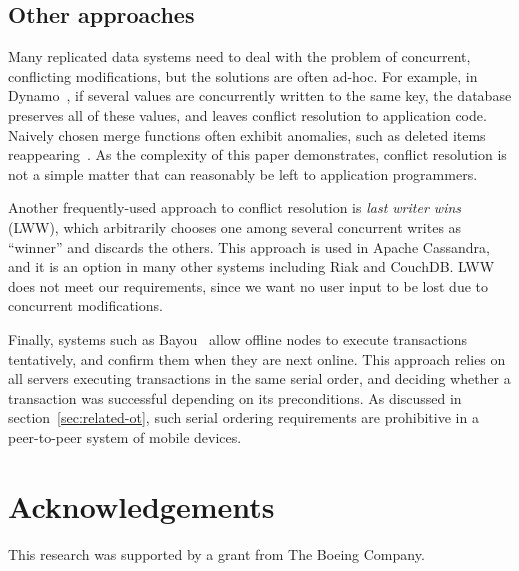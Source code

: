 \documentclass[10pt,journal,compsoc]{IEEEtran}
\begin{document}
\subsection{Other approaches}\label{sec:related-other}

Many replicated data systems need to deal with the problem of concurrent, conflicting modifications, but the solutions are often ad-hoc. For example, in Dynamo~\cite{DeCandia:2007ui}, if several values are concurrently written to the same key, the database preserves all of these values, and leaves conflict resolution to application code. Naively chosen merge functions often exhibit anomalies, such as deleted items reappearing~\cite{DeCandia:2007ui}. As the complexity of this paper demonstrates, conflict resolution is not a simple matter that can reasonably be left to application programmers.

Another frequently-used approach to conflict resolution is \emph{last writer wins} (LWW), which arbitrarily chooses one among several concurrent writes as ``winner'' and discards the others. This approach is used in Apache Cassandra, and it is an option in many other systems including Riak and CouchDB. LWW does not meet our requirements, since we want no user input to be lost due to concurrent modifications.

Finally, systems such as Bayou~\cite{Terry:1995dn} allow offline nodes to execute transactions tentatively, and confirm them when they are next online. This approach relies on all servers executing transactions in the same serial order, and deciding whether a transaction was successful depending on its preconditions. As discussed in section~\ref{sec:related-ot}, such serial ordering requirements are prohibitive in a peer-to-peer system of mobile devices.

\section*{Acknowledgements}

This research was supported by a grant from The Boeing Company.



{}
\end{document}
